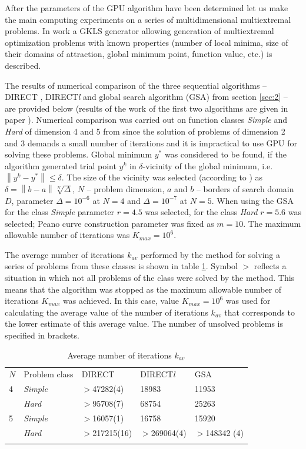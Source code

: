 \documentclass[smallcondensed]{svjour3}     %
\begin{document}
After the parameters of the GPU algorithm have been determined let us make the main computing experiments on a series of multidimensional multiextremal problems. In work \cite{RefGaviano} a GKLS generator allowing generation of multiextremal optimization problems with known properties (number of local minima, size of their domains of attraction, global minimum point, function value, etc.) is described.  

The results of numerical comparison of the three sequential algorithms -- DIRECT \cite{RefJones}, DIRECT\textit{l} \cite{RefGablonsky} and global search algorithm (GSA) from section \ref{sec:2} -- are provided below (results of the work of the first two algorithms are given in paper \cite{RefGaviano}). Numerical comparison was carried out on function classes \textit{Simple} and \textit{Hard} of dimension 4 and 5 from \cite{RefGaviano} since the solution of problems of dimension 2 and 3 demands a small number of iterations and it is impractical to use GPU for solving these problems. Global minimum $y^\ast$ was considered to be found, if the algorithm generated trial point $y^k$ in $\delta$-vicinity of the global minimum, i.e. $\left\|y^k-y^\ast\right\|\leq\delta$. The size of the vicinity was selected (according to \cite{RefGaviano}) as $\delta = \left\|b-a\right\|\sqrt[N]{\Delta}$, $N$ -- problem dimension, $a$ and $b$ -- borders of search domain $D$, parameter $\Delta=10^{-6}$ at $N=4$ and $\Delta=10^{-7}$ at $N=5$. When using the GSA for the class \textit{Simple} parameter $r=4.5$ was selected, for the class \textit{Hard} $r=5.6$ was selected; Peano curve construction parameter was fixed as $m=10$. The maximum allowable number of iterations was $K_{max} = 10^6$.

The average number of iterations $k_{av}$ performed by the method for solving a series of problems from these classes is shown in table \ref{tab:3}. Symbol $>$ reflects a situation in which not all problems of the class were solved by the method. This means that the algorithm was stopped as the maximum allowable number of iterations $K_{max}$ was achieved. In this case, value $K_{max}=10^6$ was used for calculating the average value of the number of iterations $k_{av}$ that corresponds to the lower estimate of this average value. The number of unsolved problems is specified in brackets.

\begin{table}
	\caption{Average number of iterations $k_{av}$}
	\label{tab:3}
	\center
	\begin{tabular}{lllll}
		\hline\noalign{\smallskip}
  	 $N$ & Problem class & DIRECT & DIRECT\textit{l} & GSA \\
		\noalign{\smallskip} \hline \noalign{\smallskip}
			4 &	\textit{Simple}	& $>$47282(4) &	18983 &	11953 \\
	      & \textit{Hard} &	$>$95708(7) &	68754 &	25263 \\
			5	& \textit{Simple} &	$>$16057(1) &	16758 &	15920 \\
				& \textit{Hard} &	$>$217215(16) &	$>$269064(4) & $>$148342 (4) \\
		\noalign{\smallskip}\hline
	\end{tabular}
\end{table}
\end{document}
